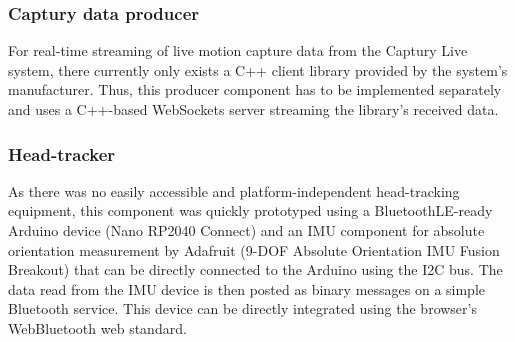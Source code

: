 \subsubsection{Captury data producer}

For real-time streaming of live motion capture data from the Captury Live system, there currently only exists a C++ client library provided by the system's manufacturer. Thus, this producer component has to be implemented separately and uses a C++-based WebSockets server streaming the library's received data.

\subsubsection{Head-tracker}

As there was no easily accessible and platform-independent head-tracking equipment, this component was quickly prototyped using a BluetoothLE-ready Arduino device (Nano RP2040 Connect) and an \ac{IMU} component for absolute orientation measurement by Adafruit (9-DOF Absolute Orientation IMU Fusion Breakout) that can be directly connected to the Arduino using the \ac{I2C} bus. The data read from the \ac{IMU} device is then posted as binary messages on a simple Bluetooth service. This device can be directly integrated using the browser's WebBluetooth web standard.
